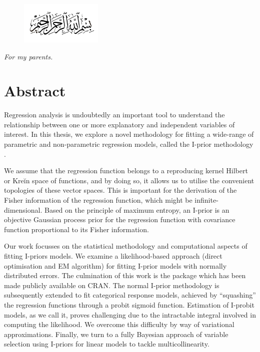 \documentclass[11pt,twoside,openright,showframe]{report}
\begin{document}
\vspace*{5mm}
\begin{figure}[H]
  \centering
  \includegraphics[width=0.35\textwidth]{figure/bismillah}
\end{figure}
\vspace*{0.75cm}
\begin{center}
  \textit{For my parents.}
\end{center}

\chapter*{Abstract}

Regression analysis is undoubtedly an important tool to understand the relationship between one or more explanatory and independent variables of interest. 
In this thesis, we explore a novel methodology for fitting a wide-range of parametric and non-parametric regression models, called the I-prior methodology \citep{bergsma2017}. 

We assume that the regression function belongs to a reproducing kernel Hilbert or Kreĭn space of functions, and by doing so, it allows us to utilise the convenient topologies of these vector spaces. 
This is important for the derivation of the Fisher information of the regression function, which might be infinite-dimensional.
Based on the principle of maximum entropy, an I-prior is an objective Gaussian process prior for the regression function with covariance function proportional to its Fisher information. 

Our work focusses on the statistical methodology and computational aspects of fitting I-priors models. 
We examine a likelihood-based approach (direct optimisation and EM algorithm) for fitting I-prior models with normally distributed errors.
The culmination of this work is the  package  \citep{jamil2017iprior} which has been made publicly available on CRAN. 
The normal I-prior methodology is subsequently extended to fit categorical response models, achieved by ``squashing'' the regression functions through a probit sigmoid function.
Estimation of I-probit models, as we call it, proves challenging due to the intractable integral involved in computing the likelihood. 
We overcome this difficulty by way of variational approximations.
Finally, we turn to a fully Bayesian approach of variable selection using I-priors for linear models to tackle multicollinearity.
\end{document}
